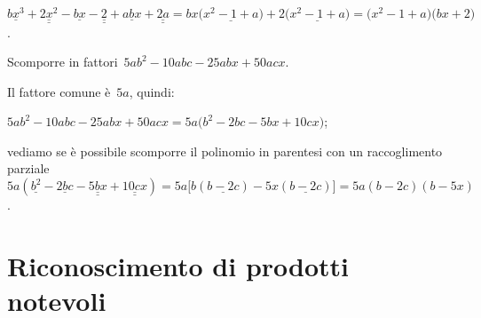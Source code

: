 \begin{exrig}
\begin{esempio}
\begin{enumeratea}

 \item $\underline{bx^{3}}+\underline{\underline {2x^{2}}}-\underline{bx}-\underline{\underline{2}}+\underline{abx}+\underline{\underline{2a}}
     =bx\bigl(\underline{x^{2}-1+a}\bigr)+2\bigl(\underline{x^{2}-1+a}\bigr)=\bigl(x^{2}-1+a\bigr)\bigl(bx+2\bigr)$.
 \end{enumeratea}
 \end{esempio}

 \begin{esempio}
Scomporre in fattori~$5ab^{2}-10abc-25abx+50acx$.
 \begin{enumeratea}
  \item Il fattore comune è~$5a$, quindi:
    \begin{itemize*}
    \item $5ab^{2}-10abc-25abx+50acx=5a\bigl(b^{2}-2bc-5bx+10cx\bigr)$;
    \end{itemize*}

 \item vediamo se è possibile scomporre il polinomio in parentesi con un raccoglimento parziale~$5a(\underline{b^{2}}-\underline{2bc}-\underline{\underline{5bx}}+\underline{\underline{10cx}})=5a\bigl[b(\underline{b-2c})-5x(\underline{b-2c})\bigr]=5a(b-2c)(b-5x)$.
 \end{enumeratea}
 \end{esempio}
\end{exrig}

\ovalbox{\risolvii \ref{ese:13.16}, \ref{ese:13.17}, \ref{ese:13.18}, \ref{ese:13.19}, \ref{ese:13.20}, \ref{ese:13.21}, \ref{ese:13.22}, \ref{ese:13.23}, \ref{ese:13.24},\ref{ese:13.25}, \ref{ese:13.26}}

\ovalbox{\ref{ese:13.27}, \ref{ese:13.28}, \ref{ese:13.29}, \ref{ese:13.30}, \ref{ese:13.31}, \ref{ese:13.32}, \ref{ese:13.33}, \ref{ese:13.34}}
\section{Riconoscimento di prodotti notevoli}

